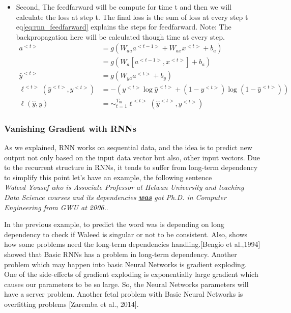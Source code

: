 \begin{itemize}
\item Second, The feedfarward will be compute for time t and then we will calculate the loss at step t. The final loss is the sum of loss at every step t eq\eqref{eq:rnn_feedfarward} explains the steps for feedfarward. Note: The backpropagation here will be calculated though time at every step.
  \begin{subequations}\label{eq:rnn_feedfarward}
\begin{align}
  a^{<t>} & = g(W_{aa}a^{<t-1>}+ W_{ax}x^{<t>}+b_a)\\
   & = g(W_a[a^{<t-1>},x^{<t>}]+ b_a)\\
  \widehat{y}^{<t>} & = g(W_{ya}a^{<t>}+ b_y)
  \\ \ell^{<t>}(\widehat{y}^{<t>},y^{<t>}) & = - (y^{<t>} \log \widehat{y}^{<t>} + (1-y^{<t>}) \log (1-\widehat{y}^{<t>}))
\\ \ell(\widehat{y},y) & = \sim_{t=1}^{T_m} \ell^{<t>}(\widehat{y}^{<t>},y^{<t>})                                              
\end{align}
\end{subequations}

  
 \end{itemize}

\newpage
 \subsubsection{Vanishing Gradient with RNNs}\label{sec_RNN_Vanishing}
 
 As we explained, RNN works on sequential data, and the idea is to predict new output not only based on the input data vector but also, other input vectors. Due to the recurrent structure in RNNs, it tends to suffer from long-term dependency to simplify this point let’s have an example, the following sentence \\
 \textit{Waleed Yousef who is Associate Professor at Helwan University and teaching Data Science courses and its dependencies \textbf{\underline{was}} got Ph.D. in Computer Engineering from GWU at 2006.}.

 In the previous example, to predict the word was is depending on long dependency to check if Waleed is singular or not to be consistent. Also, shows how some problems need the long-term dependencies handling.[Bengio et al.,1994]\cite{Bengio_ et_ al} showed that Basic RNNs has a problem in long-term dependency.  Another problem which may happen into basic Neural Networks is gradient exploding. One of the side-effects of gradient exploding is exponentially large gradient which causes our parameters to be so large. So, the Neural Networks parameters will have a server problem. Another fetal problem with Basic Neural Networks is overfitting problems [Zaremba et al., 2014]\cite{Zaremba_et_al}.
 
